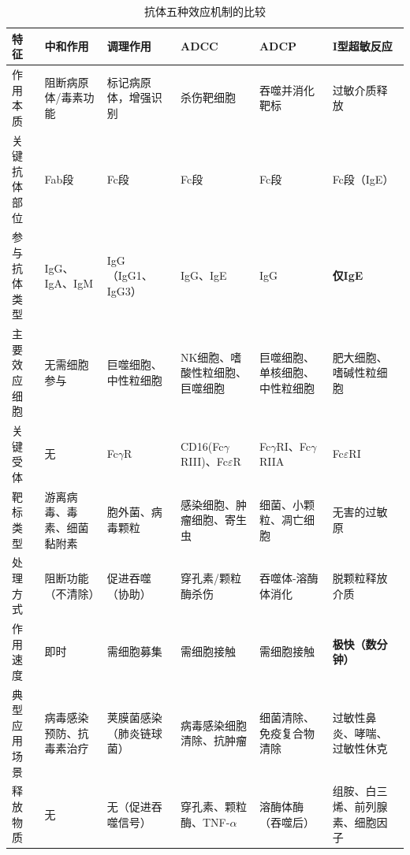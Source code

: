 \documentclass[9pt,a4paper,twoside]{rho-class/rho}
\begin{document}
        \begin{table}[H]
            \small
            \RaggedRight
            \caption{抗体五种效应机制的比较}
            \label{tab:antibody_effector_mechanisms}
            \begin{tabular}{l p{2.1cm} p{2.1cm} p{2.1cm} p{2.1cm} p{2.1cm}}
            \toprule
            \textbf{特征} & \textbf{中和作用} & \textbf{调理作用} & \textbf{ADCC} & \textbf{ADCP} & \textbf{I型超敏反应} \\
            \midrule
            作用本质 & 阻断病原体/毒素功能 & 标记病原体，增强识别 & 杀伤靶细胞 & 吞噬并消化靶标 & 过敏介质释放 \\
            \midrule
            关键抗体部位 & Fab段 & Fc段 & Fc段 & Fc段 & Fc段（IgE） \\
            \midrule
            参与抗体类型 & IgG、IgA、IgM & IgG（IgG1、IgG3） & IgG、IgE & IgG & \textbf{仅IgE} \\
            \midrule
            主要效应细胞 & 无需细胞参与 & 巨噬细胞、中性粒细胞 & NK细胞、嗜酸性粒细胞、巨噬细胞 & 巨噬细胞、单核细胞、中性粒细胞 & 肥大细胞、嗜碱性粒细胞 \\
            \midrule
            关键受体 & 无 & Fc$\gamma$R & CD16(Fc$\gamma$RIII)、Fc$\varepsilon$R & Fc$\gamma$RI、Fc$\gamma$RIIA & Fc$\varepsilon$RI \\
            \midrule
            靶标类型 & 游离病毒、毒素、细菌黏附素 & 胞外菌、病毒颗粒 & 感染细胞、肿瘤细胞、寄生虫 & 细菌、小颗粒、凋亡细胞 & 无害的过敏原 \\
            \midrule
            处理方式 & 阻断功能（不清除） & 促进吞噬（协助） & 穿孔素/颗粒酶杀伤 & 吞噬体-溶酶体消化 & 脱颗粒释放介质 \\
            \midrule
            作用速度 & 即时 & 需细胞募集 & 需细胞接触 & 需细胞接触 & \textbf{极快（数分钟）} \\
            \midrule
            典型应用场景 & 病毒感染预防、抗毒素治疗 & 荚膜菌感染（肺炎链球菌） & 病毒感染细胞清除、抗肿瘤 & 细菌清除、免疫复合物清除 & 过敏性鼻炎、哮喘、过敏性休克 \\
            \midrule
            释放物质 & 无 & 无（促进吞噬信号） & 穿孔素、颗粒酶、TNF-$\alpha$ & 溶酶体酶（吞噬后） & 组胺、白三烯、前列腺素、细胞因子 \\
            \bottomrule
            \end{tabular}
        \end{table}
\end{document}
